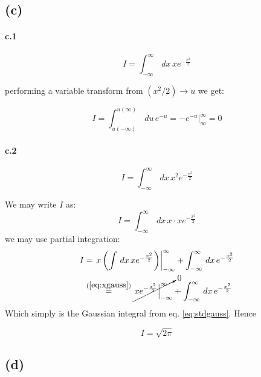 \documentclass[a4paper]{article}
\begin{document}
\subsection{(c)}
\paragraph{c.1}

\begin{equation}
I=\int_{-\infty}^{\infty}\,dx\,xe^{-\frac{x^2}{2}}
\end{equation} 

performing a variable transform from $(x^2/2) \rightarrow u$ we get:
\begin{framed}
\begin{equation}\label{eq:xgauss}
I=\int_{u(-\infty)}^{u(\infty)}\,du\,e^{-u} = \left. -e^{-u}\right|_\infty^\infty=0
\end{equation} 
\end{framed}

\paragraph{c.2}
\begin{equation}
I=\int_{-\infty}^{\infty}\,dx\,x^2e^{-\frac{x^2}{2}}
\end{equation} 

We may write $I$ as:
\begin{equation}
I=\int_{-\infty}^{\infty}\,dx\,x \cdot xe^{-\frac{x^2}{2}}
\end{equation} 
we may use partial integration:
\begin{align}
I&=\left. x \left(\int\,dx\,xe^{-\frac{x^2}{2}}\right)\right|_{-\infty}^\infty+\int_{-\infty}^{\infty}\,dx\,e^{-\frac{x^2}{2}}\\
 &\overset{(\ref{eq:xgauss})}{=}\cancelto{0}{\left.xe^{-\frac{x^2}{2}}\right|_{-\infty}^\infty}+\int_{-\infty}^{\infty}\,dx\,e^{-\frac{x^2}{2}}
\end{align}
Which simply is the Gaussian integral from eq. \ref{eq:stdgauss}. Hence
\begin{framed}
\begin{equation}
I=\sqrt{2\pi}
\end{equation}
\end{framed} 

\subsection{(d)}
\end{document}
